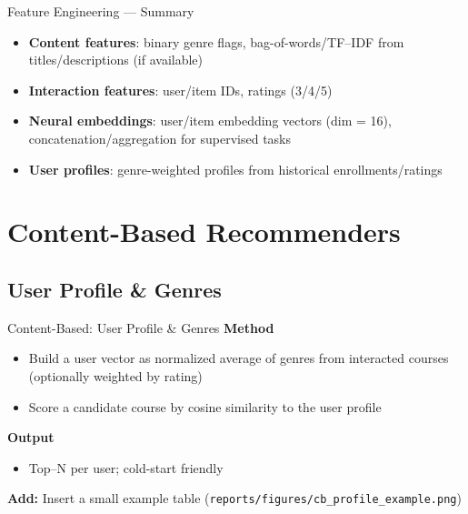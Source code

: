 \documentclass[aspectratio=169]{beamer}
\begin{document}
\begin{frame}{Feature Engineering — Summary}
\begin{itemize}
  \item \textbf{Content features}: binary genre flags, bag-of-words/TF--IDF from titles/descriptions (if available)
  \item \textbf{Interaction features}: user/item IDs, ratings (3/4/5)
  \item \textbf{Neural embeddings}: user/item embedding vectors (dim = 16), concatenation/aggregation for supervised tasks
  \item \textbf{User profiles}: genre-weighted profiles from historical enrollments/ratings
\end{itemize}
\end{frame}

\section{Content-Based Recommenders}

\subsection{User Profile \& Genres}
\begin{frame}{Content-Based: User Profile \& Genres}
\textbf{Method}
\begin{itemize}
  \item Build a user vector as normalized average of genres from interacted courses (optionally weighted by rating)
  \item Score a candidate course by cosine similarity to the user profile
\end{itemize}

\textbf{Output}
\begin{itemize}
  \item Top--N per user; cold-start friendly
\end{itemize}

\medskip
\textbf{Add:} Insert a small example table (\texttt{reports/figures/cb\_profile\_example.png})
\end{frame}
\end{document}
